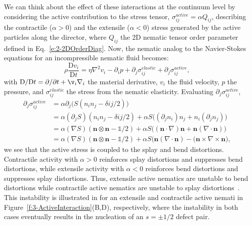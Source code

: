 We can think about the effect of these interactions at the continuum level by considering the active contribution to the stress tensor, $\sigma^{active}_{ij} = \alpha Q_{ij}$, describing the contractile ($\alpha > 0$) and the extensile ($\alpha < 0$) stress generated by the active particles along the director, where $Q_{ij}$ the 2D nematic tensor order parameter defined in Eq.~\ref{e:2-2DOrderDiag}.
Now, the nematic analog to the Navier-Stokes equations for an incompressible nematic fluid becomes:
\begin{equation}
  \rho \frac{\textrm{D} v_i}{\textrm{D}t } = \eta \nabla^2 v_i - \partial_i p + \partial_j \sigma_{ij}^{elastic} + \partial_j \sigma_{ij}^{active},\label{e:3-NavierStokes}
\end{equation}
with $\textrm{D}/\textrm{D}t = \partial/\partial t + \v_i \nabla_i$ the material derivative, $v_i$ the fluid velocity, $p$ the pressure, and $\sigma_{ij}^{elastic}$ the stress from the nematic elasticity.
Evaluating $\partial_j \sigma^{active}_{ij}$,
\label{e:3-ActiveInstability}
\begin{align}
  \partial_j \sigma^{active}_{ij} &= \alpha \partial_j \big(S(n_in_j - \delta{ij}/2)\big)\tag{\theequation a} \\
  &= \alpha(\partial_j S)(n_in_j - \delta{ij}/2) + \alpha S \big((\partial_j n_i)n_j + n_i(\partial_j n_j) \big)\tag{\theequation b} \\
  &= \alpha (\nabla S)(\mathbf{n} \otimes \mathbf{n}-\mathbb{1}/2) + \alpha S \big((\mathbf{n} \cdot \nabla)\mathbf{n} + \mathbf{n}(\nabla \cdot \mathbf{n}) \big)\tag{\theequation c} \\
  &=  \alpha (\nabla S)(\mathbf{n} \otimes \mathbf{n}-\mathbb{1}/2) + \alpha S \big(\mathbf{n}(\nabla \cdot \mathbf{n}) - (\mathbf{n} \times \nabla \times \mathbf{n}  \big),\tag{\theequation d}
\end{align}
we see that the active stress is coupled to the splay and bend distortions.  Contractile activity with $\alpha > 0$ reinforces splay distortions and suppresses bend distortions,  while extensile activity with $\alpha < 0$ reinforces bend distortions and suppresses splay distortions.
Thus, extensile active nematics are unstable to bend distortions while contractile active nematics are unstable to splay distortions~\cite{RN171,RN170,RN11}.
This instability is illustrated in for an extensile and contractile active nemati in Figure~\ref{f:3-ActiveInteraction}(B,D), respectively, where the instability in both cases eventually results in the nucleation of an $s=\pm 1/2$ defect pair.

